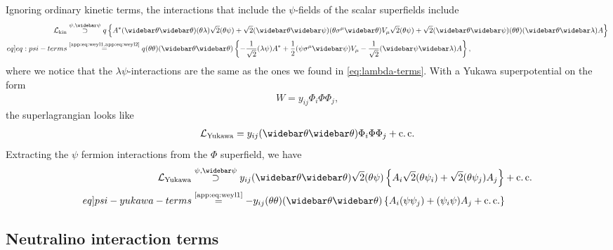 \documentclass[english, notitlepage]{article}
\begin{document}
        Ignoring ordinary kinetic terms, the interactions that include the $\psi$-fields of the scalar superfields include
        \begin{align} \nonumber
            \msub{\L}{kin} &\stackrel{\psi, \wbar\psi}{\supset} q \cclosed{ A^* (\wbar\theta\wbar\theta) (\theta\lambda) \sqrt{2} (\theta\psi) + \sqrt{2} (\wbar\theta\wbar\psi) (\theta\sigma^\mu\wbar\theta) V_\mu \sqrt{2} (\theta\psi) + \sqrt{2} (\wbar\theta\wbar\psi) (\theta\theta) (\wbar\theta\wbar\lambda) A } \\ \label[eq]{eq:psi-terms}
            &\stackrel{\text{\cref{app:eq:weyl1,app:eq:weyl2}}}{=} q(\theta\theta)(\wbar\theta\wbar\theta) \cclosed{ -\frac{1}{\sqrt{2}} (\lambda\psi) A^* + \frac{1}{2} (\psi\sigma^\mu\wbar\psi)V_\mu - \frac{1}{\sqrt{2}} (\wbar\psi\wbar\lambda)A },
        \end{align}
        where we notice that the $\lambda\psi$-interactions are the same as the ones we found in \cref{eq:lambda-terms}.
        With a Yukawa superpotential on the form
        \begin{align}
            W = y_{ij} \Phi_i \Phi \Phi_j,
        \end{align}
        the superlagrangian looks like
        \begin{align}
            \msub{\L}{Yukawa} = y_{ij} (\wbar\theta\wbar\theta) \Phi_i \Phi \Phi_j + \cc
        \end{align}
        Extracting the $\psi$ fermion interactions from the $\Phi$ superfield, we have
        \begin{align} \nonumber
            \msub{\L}{Yukawa} &\stackrel{\psi, \wbar\psi}{\supset} y_{ij} (\wbar\theta\wbar\theta) \sqrt{2} (\theta\psi) \cclosed{ A_i \sqrt{2}(\theta\psi_i) + \sqrt{2}(\theta\psi_j)A_j } + \cc \\ \label[eq]{psi-yukawa-terms}
            &\stackrel{\text{\cref{app:eq:weyl1}}}{=} -y_{ij} (\theta\theta)(\wbar\theta\wbar\theta) \cclosed{ A_i(\psi\psi_j) + (\psi_i\psi)A_j + \cc } 
        \end{align}

        \subsection{Neutralino interaction terms}
\end{document}

